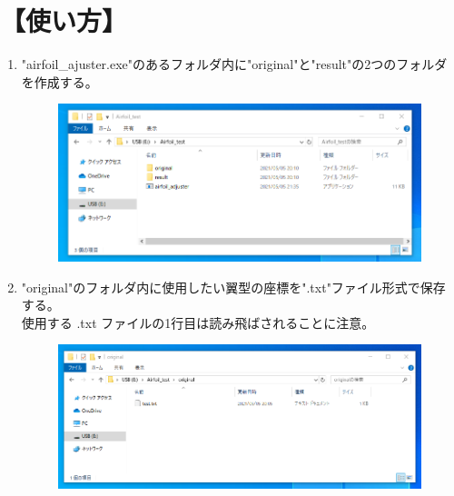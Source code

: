 \documentclass[12pt,a4paper]{jsarticle}
\title{}
\author{}
\date{}
\begin{document}
\section*{【使い方】}
\begin{enumerate}
    \item "airfoil\_ajuster.exe"のあるフォルダ内に"original"と"result"の2つのフォルダを作成する。
          \begin{figure}[htbp]
              \begin{center}
                  \includegraphics[width=120mm]{gazou_1.png}
              \end{center}
          \end{figure}
    \item "original"のフォルダ内に使用したい翼型の座標を".txt"ファイル形式で保存する。\\
          使用する .txt ファイルの1行目は読み飛ばされることに注意。
          \begin{figure}[htbp]
              \begin{center}
                  \includegraphics[width=120mm]{gazou_2.png}
              \end{center}
          \end{figure} \\
          \begin{figure}[htbp]
              \begin{center}

\end{center}
\end{figure}
\end{enumerate}
\end{document}
